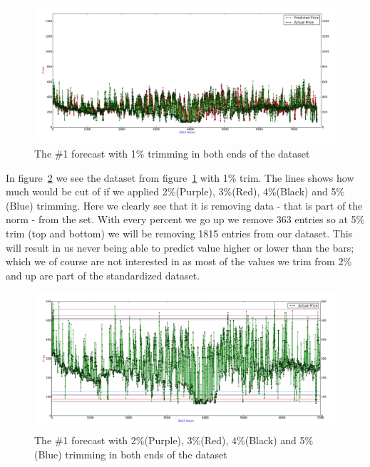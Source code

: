\begin{figure}[H]
\centering
\includegraphics[width=0.85\linewidth,natwidth=898,natheight=587]{billeder/PriceExperimentalAnalysis/1PTrim.jpg}
\caption{The \#1 forecast with 1\% trimming in both ends of the dataset}
\label{fig:1PTrim}
\end{figure}

In figure~\ref{fig:AllTrims} we see the dataset from figure~\ref{fig:1PTrim} with 1\% trim. The lines shows how much would be cut of if we applied 2\%(Purple), 3\%(Red), 4\%(Black) and 5\%(Blue) trimming. Here we clearly see that it is removing data - that is part of the norm - from the set. With every percent we go up we remove 363 entries so at 5\% trim (top and bottom) we will be removing 1815 entries from our dataset. This will result in us never being able to predict value higher or lower than the bars; which we of course are not interested in as most of the values we trim from 2\% and up are part of the standardized dataset.

\begin{figure}[H]
\centering
\includegraphics[width=0.85\linewidth,natwidth=898,natheight=587]{billeder/PriceExperimentalAnalysis/restOfTrims.jpg}
\caption{The \#1 forecast with 2\%(Purple), 3\%(Red), 4\%(Black) and 5\%(Blue) trimming in both ends of the dataset}
\label{fig:AllTrims}
\end{figure}



